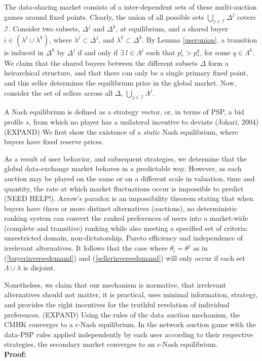 \documentclass[sigconf, anonymous]{acmart}
\newcommand{\mcI}{\mathcal{I}}
\theoremstyle{definition}
\begin{document}
The data-sharing market consists of a inter-dependent sets of these
multi-auction games around fixed points.  Clearly, the union of all possible
sets $\bigcup_{j\in\mcI} \Delta^j$ covers $\mcI$. Consider two subsets, $\Delta^j$
and $\Delta^k$, at equilibrium, and a shared
buyer $i\in (\lambda^j \cup \lambda^k)$, where
$\lambda^j\subset\Delta^j$, and  $\lambda^k\subset \Delta^k$.  By Lemma
\ref{userunion}, a transition is induced in $\Delta^k$ by $\Delta^j$ if and only if
$\exists \ l \in \Lambda^j$ such that $p_*^{l} > p_*^{q}$, for some
$q\in\Lambda^k$. We claim that the shared buyers
between the different subsets $\Delta$ form a heirarchical structure, and that
there can only be a single primary fixed point, and this seller determines
the equilibrium price in the global market. Now, consider the set of sellers across all $\Delta$,
$\bigcup_{j\in\mcI}\Lambda^j$.









A Nash equilibrium is defined as a strategy vector, or, in terms of PSP, a bid
profile $s$,
from which no player has a unilateral incentive to deviate (Johari, 2004)
(EXPAND)
We first show the existence of a \emph{static} Nash equilibrium, where buyers have fixed reserve
prices.

{
}

As a result of user behavior, and subsequent strategies, we determine that the
global data-exchange market behaves in a predictable way. However, as
each auction may be played on the same or on a different scale in
valuation, time and quantity, the rate at which market fluctuations occur is
impossible to predict (NEED HELP!). 
Arrow's paradox is an impossibility theorem stating that when buyers have three
or more distinct alternatives (auctions), no deterministic ranking system can
convert the ranked preferences of users into a market-wide (complete
and transitive) ranking while also meeting a specified set of criteria:
unrestricted domain, non-dictatorship, Pareto efficiency and independence of
irrelevant alternatives. It follows that the case where
$\theta_i = \theta^j$ as in (\ref{buyerinversedemand}) and
(\ref{sellerinversedemand}) will only occur if each set $\Lambda \cup \lambda$
is disjoint.

Nonetheless, we claim that our mechanism is normative, that irrelevant
alternatives should not matter, it is practical, uses minimal information,
strategy, and provides the right incentives for the truthful revelation of individual preferences. 
(EXPAND)
{
Using the rules of the data auction mechanism, the CMHK
\cite{zheng} converges to a $\epsilon$-Nash equilibrium. In the network auction
game with the data-PSP rules applied independently by each user according to their respective strategies, the secondary market converges to an $\epsilon$-Nash
equilibrium. 
}\\
\textbf{Proof:}
\end{document}
